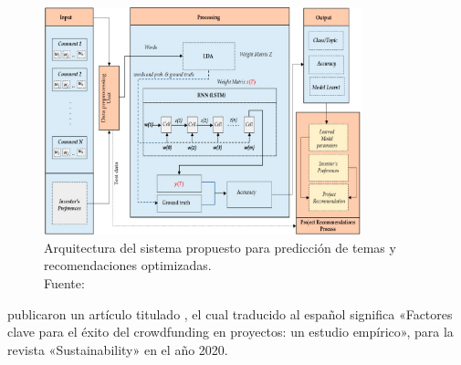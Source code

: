 \begin{figure}[!ht]
	\begin{center}
		\includegraphics[width=0.82\textwidth]{2/figures/shafqat2019.jpg}
		\caption[Arquitectura del sistema propuesto para predicción de temas y recomendaciones optimizadas]{Arquitectura del sistema propuesto para predicción de temas y recomendaciones optimizadas.\\
		Fuente: \cite{pr_shafqat2019topicpredictions}}
		\label{2:fig128}
	\end{center}
\end{figure}

\cite{pr_fernandezblanco2020crowdfunding_empirical} publicaron un artículo titulado , el cual traducido al español significa «Factores clave para el éxito del crowdfunding en proyectos: un estudio empírico», para la revista «Sustainability» en el año 2020.